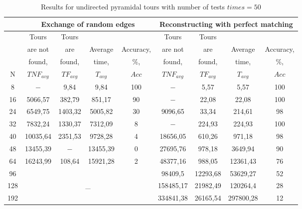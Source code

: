 \documentclass[runningheads]{llncs}
\begin{document}
\begin{table}[t]
	\centering
	\caption{Results for undirected pyramidal tours with number of tests $times = 50$}	\label{tabl:table1}
	\begin{tabular}{|*{9}{c|}}
		\hline
		& \multicolumn{4}{c|}{Exchange of random edges} &  \multicolumn{4}{c|}{Reconstructing with perfect matching} \\ 
		\hline
		& Tours & Tours &  &  & Tours & Tours &  & \\
		& are not & are & Average & Accuracy, & are not & are & Average & Accuracy,\\
		& found, & found, & time, & \%, & found, & found, & time, & \%, \\
		N & $TNF_{avg}$ & $TF_{avg}$ & $T_{avg}$ & $Acc$ & $TNF_{avg}$ & $TF_{avg}$ & $T_{avg}$ & $Acc$ \\ 
		\hline
		8 & $-$ & 9,84 & 9,84 & 100 & $-$ & 5,57 & 5,57 & 100 \\ 
		\hline
		16 & 5066,57 & 382,79 & 851,17 & 90 & $-$ & 22,08 & 22,08 & 100 \\ 
		\hline
		24 & 6549,75 & 1403,32 & 5005,82 & 30 & 9096,65 & 33,34 & 214,61 & 98 \\ 
		\hline
		32 & 7832,24 & 1330,37 & 7312,09 & 8 & $-$ & 224,93 & 224,93 & 100 \\ 
		\hline
		40 & 10035,64 & 2351,53 & 9728,28 & 4 & 18656,05 & 610,26 & 971,18 & 98 \\
		\hline
		48 & 13455,39 & $-$ & 13455,39 & 0 & 27695,76 & 978,18 & 3649,94 & 90 \\
		\hline
		64 & 16243,99 & 108,64 & 15921,28 & 2 & 48377,16 & 988,05 & 12361,43 & 76 \\ 
		\hline
		96 &  \multicolumn{4}{c|}{} & 98409,5 & 12293,68 & 53629,27 & 52 \\ 
		\cline{1-1}\cline{6-9}
		128 &  \multicolumn{4}{c|}{\_}  & 158485,17 & 21982,49 & 120264,4 & 28 \\ 
		\cline{1-1}\cline{6-9}
		192 &  \multicolumn{4}{c|}{}  & 334841,38 & 26165,54 & 297800,28 & 12 \\ 
		\hline
	\end{tabular}
\end{table} 
\end{document}
